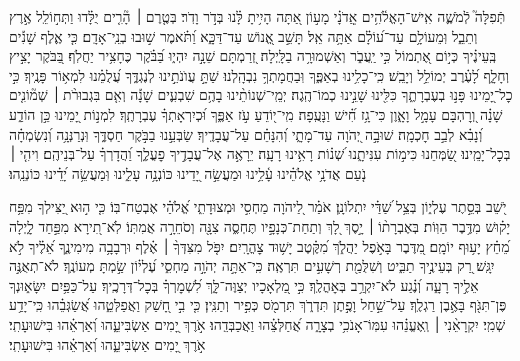 \documentclass[twoside, openany, parskip=half, 11pt]{book}
\begin{document}
\begin{narrow}
תְּֿפִלָּה֮ לְֿמֹשֶׁ֢ה אִֽישׁ־הָאֱלֹ֫הִ֥ים
אֲֽדֹנָ֗י מָע֣וֹן אַ֭תָּה הָיִ֥יתָ לָּ֗נוּ בְּדֹ֣ר וָדֹֽר׃
בְּטֶ֤רֶם ׀ הָ֘רִ֤ים יֻלָּ֗דוּ וַתְּח֣וֹלֵֽל אֶ֣רֶץ וְתֵבֵ֑ל וּֽמֵעוֹלָ֥ם עַד־ע֝וֹלָ֗ם אַתָּ֥ה אֵֽל׃
תָּשֵׁ֣ב אֱ֭נוֹשׁ עַד־דַּכָּ֑א וַ֝תֹּ֗אמֶר שׁ֣וּבוּ בְנֵֽי־אָדָֽם׃
כִּ֤י אֶ֪לֶף שָׁנִ֡ים בְּֽעֵינֶ֗יךָ כְּי֣וֹם אֶ֭תְמוֹל כִּ֣י יַֽעֲבֹ֑ר וְאַשְׁמוּרָ֥ה בַלָּֽיְלָה׃
זְ֭רַמְתָּם שֵׁנָ֣ה יִהְי֑וּ בַּ֝בֹּ֗קֶר כֶּחָצִ֥יר יַחֲלֹֽף׃
בַּ֭בֹּקֶר יָצִ֣יץ וְחָלָ֑ף לָ֝עֶ֗רֶב יְמוֹלֵ֥ל וְיָבֵֽשׁ׃
כִּֽי־כָלִ֥ינוּ בְאַפֶּ֑ךָ וּֽבַחֲמָתְךָ֥ נִבְהָֽלְנוּ׃
שַׁתָּ֣ עֲוֺנֹתֵ֣ינוּ לְנֶגְדֶּ֑ךָ עֲ֝לֻמֵ֗נוּ לִמְא֥וֹר פָּנֶֽיךָ׃
כִּ֣י כׇל־יָ֭מֵינוּ פָּנ֣וּ בְעֶבְרָתֶ֑ךָ כִּלִּ֖ינוּ שָׁנֵ֣ינוּ כְמוֹ־הֶֽגֶה׃
יְמֵֽי־שְׁנוֹתֵ֨ינוּ בָהֶ֥ם שִׁבְעִ֪ים שָׁנָ֡ה וְאִ֤ם בִּגְבוּרֹ֨ת ׀ שְׁמ֘וֹנִ֤ים שָׁנָ֗ה וְ֭רׇהְבָּם עָמָ֣ל וָאָ֑וֶן כִּי־גָ֥ז חִ֗֝ישׁ וַנָּעֻֽפָה׃
מִֽי־י֭וֹדֵעַ עֹ֣ז אַפֶּ֑ךָ וּ֝כְיִרְאָתְךָ֗ עֶבְרָתֶֽךָ׃
לִמְנ֣וֹת יָ֭מֵינוּ כֵּ֣ן הוֹדַ֑ע וְ֝נָבִ֗א לְבַ֣ב חׇכְמָֽה׃
שׁוּבָ֣ה יְ֭הֹוָה עַד־מָתָ֑י וְ֝הִנָּחֵ֗ם עַל־עֲבָדֶֽיךָ׃
שַׂבְּעֵ֣נוּ בַבֹּ֣קֶר חַסְדֶּ֑ךָ וּֽנְרַנְּנָ֥ה וְ֝נִשְׂמְחָ֗ה בְּכׇל־יָמֵֽינוּ׃
שַׂ֭מְּחֵנוּ כִּימ֣וֹת עִנִּיתָ֑נוּ שְׁ֝נ֗וֹת רָאִ֥ינוּ רָעָֽה׃
יֵרָאֶ֣ה אֶל־עֲבָדֶ֣יךָ פׇעֳלֶ֑ךָ וַ֝הֲדָרְךָ֗ עַל־בְּנֵיהֶֽם׃
וִיהִ֤י ׀ נֹ֤עַם אֲדֹנָ֥י אֱלֹהֵ֗ינוּ עָ֫לֵ֥ינוּ וּמַעֲשֵׂ֣ה יָ֭דֵינוּ כּוֹנְנָ֥ה עָלֵ֑ינוּ וּֽמַעֲשֵׂ֥ה יָ֝דֵ֗ינוּ כּוֹנְנֵֽהוּ׃ 


יֹ֭שֵׁב בְּסֵ֣תֶר עֶלְי֑וֹן בְּצֵ֥ל שַׁ֝דַּ֗י יִתְלוֹנָֽן׃
אֹמַ֗ר לַ֭יהֹוָה מַחְסִ֣י וּמְצוּדָתִ֑י אֱ֝לֹהַ֗י אֶבְטַח־בּֽוֹ׃
כִּ֤י ה֣וּא יַ֭צִּילְךָ מִפַּ֥ח יָק֗וּשׁ מִדֶּ֥בֶר הַוּֽוֹת׃
בְּאֶבְרָת֨וֹ ׀ יָ֣סֶךְ לָ֭ךְ וְתַחַת־כְּנָפָ֣יו תֶּחְסֶ֑ה צִנָּ֖ה וְסֹחֵרָ֣ה אֲמִתּֽוֹ׃
לֹֽא־תִ֭ירָא מִפַּ֣חַד לָ֑יְלָה מֵ֝חֵ֗ץ יָע֥וּף יוֹמָֽם׃
מִ֭דֶּבֶר בָּאֹ֣פֶל יַהֲלֹ֑ךְ מִ֝קֶּ֗טֶב יָשׁ֥וּד צׇהֳרָֽיִם׃
יִפֹּ֤ל מִצִּדְּךָ֨ ׀ אֶ֗לֶף וּרְבָבָ֥ה מִימִינֶ֑ךָ אֵ֝לֶ֗יךָ לֹ֣א יִגָּֽשׁ׃
רַ֭ק בְּעֵינֶ֣יךָ תַבִּ֑יט וְשִׁלֻּמַ֖ת רְשָׁעִ֣ים תִּרְאֶֽה׃
כִּֽי־אַתָּ֣ה יְהֹוָ֣ה מַחְסִ֑י עֶ֝לְי֗וֹן שַׂ֣מְתָּ מְעוֹנֶֽךָ׃
לֹא־תְאֻנֶּ֣ה אֵלֶ֣יךָ רָעָ֑ה וְ֝נֶ֗גַע לֹא־יִקְרַ֥ב בְּאׇהֳלֶֽךָ׃
כִּ֣י מַ֭לְאָכָיו יְצַוֶּה־לָּ֑ךְ לִ֝שְׁמׇרְךָ֗ בְּכׇל־דְּרָכֶֽיךָ׃
עַל־כַּפַּ֥יִם יִשָּׂא֑וּנְךָ פֶּן־תִּגֹּ֖ף בָּאֶ֣בֶן רַגְלֶֽךָ׃
עַל־שַׁ֣חַל וָפֶ֣תֶן תִּדְרֹ֑ךְ תִּרְמֹ֖ס כְּפִ֣יר וְתַנִּֽין׃
כִּ֤י בִ֣י חָ֭שַׁק וַאֲפַלְּטֵ֑הוּ אֲ֝שַׂגְּבֵ֗הוּ כִּֽי־יָדַ֥ע שְׁמִֽי׃
יִקְרָאֵ֨נִי ׀ וְֽאֶעֱנֵ֗הוּ עִמּֽוֹ־אָנֹכִ֥י בְצָרָ֑ה אֲ֝חַלְּצֵ֗הוּ וַאֲכַבְּדֵֽהוּ׃
אֹ֣רֶךְ יָ֭מִים אַשְׂבִּיעֵ֑הוּ וְ֝אַרְאֵ֗הוּ בִּישׁוּעָתִֽי׃ 
\scriptsize{אֹ֣רֶךְ יָ֭מִים אַשְׂבִּיעֵ֑הוּ וְ֝אַרְאֵ֗הוּ בִּישׁוּעָתִֽי׃ }
\normalsize{}


\end{narrow}
\end{document}
